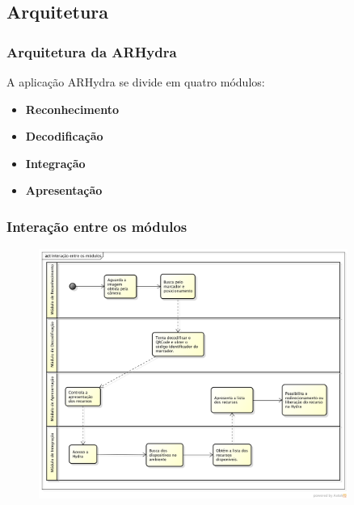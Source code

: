 \documentclass{beamer}
\begin{document}
	
	
	\subsection{Arquitetura}	
	\begin{frame}
		\frametitle{Arquitetura da ARHydra}
		
		A aplicação ARHydra se divide em quatro módulos:
		
		\begin{itemize}
		  \item \textbf{Reconhecimento}
		  \item \textbf{Decodificação}
		  \item \textbf{Integração}
		  \item \textbf{Apresentação}
		\end{itemize}
		
	\end{frame}
	
	
	\begin{frame}
		\frametitle{Interação entre os módulos}
		
		\begin{figure}[htb]
			\begin{center}
					\includegraphics[width=0.9\textwidth]{figuras/interacao_modulos.png}
			\end{center}
		\end{figure}
	
	\end{frame}
		
\end{document}
